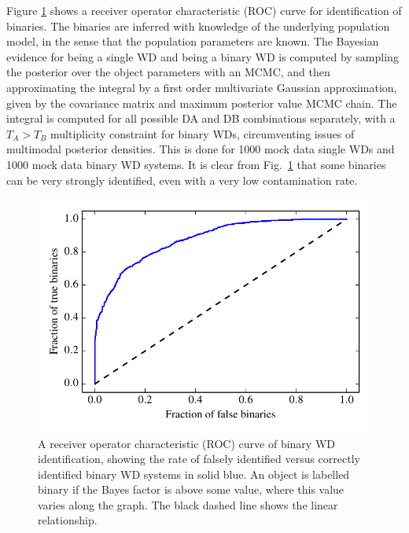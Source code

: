 \documentclass[fleqn,usenatbib]{mnras}
\newcommand{\Teff}{T}
\begin{document}
Figure \ref{fig:ROC_binaries} shows a receiver operator characteristic (ROC) curve for identification of binaries. The binaries are inferred with knowledge of the underlying population model, in the sense that the population parameters are known. The Bayesian evidence for being a single WD and being a binary WD is computed by sampling the posterior over the object parameters with an MCMC, and then approximating the integral by a first order multivariate Gaussian approximation, given by the covariance matrix and maximum posterior value MCMC chain. The integral is computed for all possible DA and DB combinations separately, with a $\Teff_A>\Teff_B$ multiplicity constraint for binary WDs, circumventing issues of multimodal posterior densities. This is done for 1000 mock data single WDs and 1000 mock data binary WD systems. It is clear from Fig.~\ref{fig:ROC_binaries} that some binaries can be very strongly identified, even with a very low contamination rate.
\begin{figure}
	\includegraphics[width=\columnwidth]{ROC_binaries.pdf}
    \caption{A receiver operator characteristic (ROC) curve of binary WD identification, showing the rate of falsely identified versus correctly identified binary WD systems in solid blue. An object is labelled binary if the Bayes factor is above some value, where this value varies along the graph. The black dashed line shows the linear relationship.}
    \label{fig:ROC_binaries}
\end{figure}
\end{document}
